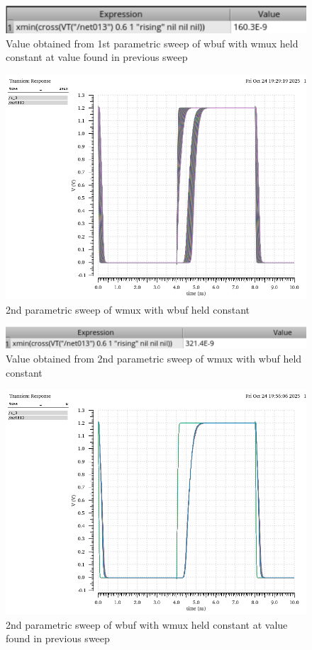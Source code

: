 \documentclass[12pt]{article}
\begin{document}
\begin{figure}[H]
    \centering
    \includegraphics[width=0.5\linewidth]{writeup//figures/wbuf2.png}
    \caption{Value obtained from 1st parametric sweep of wbuf with wmux held constant at value found in previous sweep}
\end{figure}

\begin{figure}[H]
    \centering
    \includegraphics[width=0.5\linewidth]{writeup//figures/wmux_parametric_sweep3.png}
    \caption{2nd parametric sweep of wmux with wbuf held constant}
\end{figure}

\begin{figure}[H]
    \centering
    \includegraphics[width=0.5\linewidth]{writeup//figures/wmux3.png}
    \caption{Value obtained from 2nd parametric sweep of wmux with wbuf held constant}
\end{figure}

\begin{figure}[H]
    \centering
    \includegraphics[width=0.5\linewidth]{writeup//figures/wbuf_parametric_sweep3.png}
    \caption{2nd parametric sweep of wbuf with wmux held constant at value found in previous sweep}
\end{figure}
\end{document}
